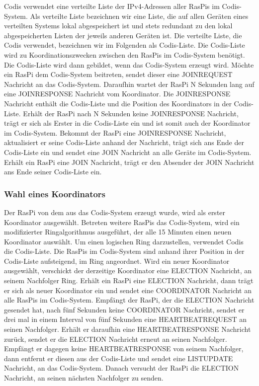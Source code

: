 \documentclass[journal]{IEEEtran}
\begin{document}
Codis verwendet eine verteilte Liste der IPv4-Adressen aller RasPis im Codis-System. Als verteilte Liste bezeichnen wir eine Liste, die auf allen Geräten eines verteilten Systems lokal abgespeichert ist und stets redundant zu den lokal abgespeicherten Listen der jeweils anderen Geräten ist. Die verteilte Liste, die Codis verwendet, bezeichnen wir im Folgenden als Codis-Liste. Die Codis-Liste wird zu Koordinationszwecken zwischen den RasPis im Codis-System benötigt.
Die Codis-Liste wird dann gebildet, wenn das Codis-System erzeugt wird. Möchte ein RasPi dem Codis-System beitreten, sendet dieser eine \MakeUppercase{joinrequest} Nachricht an das Codis-System. Daraufhin wartet der RasPi N Sekunden lang auf eine \MakeUppercase{joinresponse} Nachricht vom Koordinator. Die \MakeUppercase{joinresponse} Nachricht enthält die Codis-Liste und die Position des Koordinators in der Codis-Liste. Erhält der RasPi nach N Sekunden keine \MakeUppercase{joinresponse} Nachricht, trägt er sich als Erster in die Codis-Liste ein und ist somit auch der Koordinator im Codis-System. Bekommt der RasPi eine \MakeUppercase{joinresponse} Nachricht, aktualisiert er seine Codis-Liste anhand der Nachricht, trägt sich ans Ende der Codis-Liste ein und sendet eine \MakeUppercase{join} Nachricht an alle Geräte im Codis-System. Erhält ein RasPi eine \MakeUppercase{join} Nachricht, trägt er den Absender der \MakeUppercase{join} Nachricht ans Ende seiner Codis-Liste ein.

\subsubsection{Wahl eines Koordinators}

Der RasPi von dem aus das Codis-System erzeugt wurde, wird als erster Koordinator ausgewählt. Betreten weitere RasPis das Codis-System, wird ein modifizierter Ringalgorithmus\cite{verteilte1}\cite{verteilte2} ausgeführt, der alle 15 Minuten einen neuen Koordinator auswählt. Um einen logischen Ring darzustellen, verwendet Codis die Codis-Liste. Die RasPis im Codis-System sind anhand ihrer Position in der Codis-Liste aufsteigend, im Ring angeordnet. Wird ein neuer Koordinator ausgewählt, verschickt der derzeitige Koordinator eine \MakeUppercase{election} Nachricht, an seinem Nachfolger Ring. Erhält ein RasPi eine \MakeUppercase{election} Nachricht, dann trägt er sich als neuer Koordinator ein und sendet eine \MakeUppercase{coordinator} Nachricht an alle RasPis im Codis-System. Empfängt der RasPi, der die \MakeUppercase{election} Nachricht gesendet hat, nach fünf Sekunden keine \MakeUppercase{coordinator} Nachricht, sendet er drei mal in einem Interval von fünf Sekunden eine \MakeUppercase{heartbeatrequest} an seinen Nachfolger. Erhält er daraufhin eine \MakeUppercase{heartbeatresponse} Nachricht zurück, sendet er die \MakeUppercase{election} Nachricht erneut an seinen Nachfolger. Empfängt er dagegen keine \MakeUppercase{heartbeatresponse} von seinem Nachfolger, dann entfernt er diesen aus der Codis-Liste und sendet eine \MakeUppercase{listupdate} Nachricht, an das Codis-System. Danach versucht der RasPi die \MakeUppercase{election} Nachricht, an seinen nächsten Nachfolger zu senden.
\end{document}
